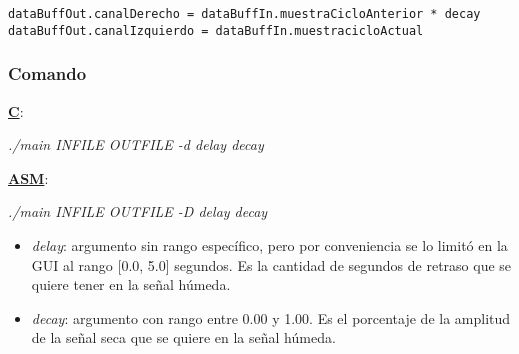 \lstset{language=C}
\begin{lstlisting}[frame=single]
dataBuffOut.canalDerecho = dataBuffIn.muestraCicloAnterior * decay
dataBuffOut.canalIzquierdo = dataBuffIn.muestracicloActual
\end{lstlisting}

\subsubsection{Comando}
\label{subsec:desarrollo-delay-call}

\underline{\textbf{C}}:
\begin{center}
 \textit{./main INFILE OUTFILE -d delay decay}
\end{center}

\underline{\textbf{ASM}}:
\begin{center}
 \textit{./main INFILE OUTFILE -D delay decay}
\end{center}

\begin{itemize}
 \item \textit{delay}: argumento sin rango específico, pero por conveniencia se lo limitó en la GUI al rango [0.0, 5.0] segundos. Es la cantidad de segundos de retraso que se quiere tener en la señal húmeda.
 \item \textit{decay}: argumento con rango entre 0.00 y 1.00. Es el porcentaje de la amplitud de la señal seca que se quiere en la señal húmeda.
\end{itemize}
